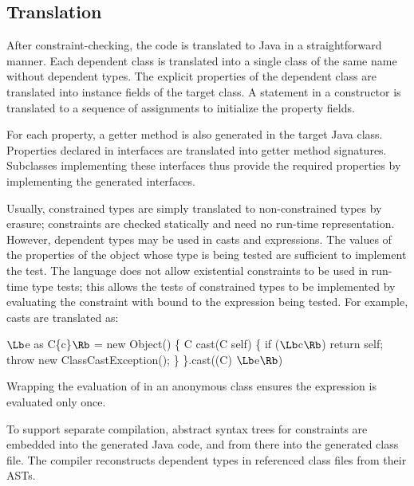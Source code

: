 


\subsection{Translation}

After constraint-checking, the \Xten{} code is translated to
Java in a straightforward manner.  Each dependent class
is translated into a single class of the same name without dependent
types. The explicit properties of the dependent class are translated
into   instance fields of the target class.
A  statement in a constructor is translated to a
sequence of assignments to initialize the property fields.

For each property, a getter method is also generated in the
target Java class.
Properties declared in interfaces are translated into getter
method signatures.  Subclasses implementing these interfaces
thus provide the required properties by implementing the
generated interfaces.

Usually, constrained types are simply translated to
non-constrained types by erasure; constraints are checked
statically and need no run-time representation.
However, dependent types may be used in casts
and  expressions.  
The values of the properties of the object whose type is being tested
are sufficient to implement the test.
The language does not allow
existential constraints to be used in run-time type tests; this
allows the tests of constrained types to be implemented
by evaluating the constraint with
 bound to the expression being tested.
For example, casts are translated as:
\begin{code}
  $\Lb$e as C\{c\}$\Rb$ = 
    new Object() \{
      C cast(C self) \{
        if ($\Lb$c$\Rb$) return self;
        throw new ClassCastException(); \}
    \}.cast((C) $\Lb$e$\Rb$)
\end{code}
\noindent Wrapping the evaluation of  in an anonymous class
ensures the expression  is evaluated only once.

To support separate compilation, abstract syntax trees for
constraints are embedded into the generated Java code, and from
there into the generated class file.  The compiler reconstructs
dependent types in referenced class files from their ASTs.


